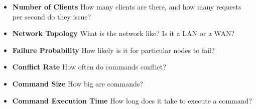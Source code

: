 \begin{itemize}
  \item \textbf{Number of Clients}
    How many clients are there, and how many requests per second do they issue?

  \item \textbf{Network Topology}
    What is the network like? Is it a LAN or a WAN?

  \item \textbf{Failure Probability}
    How likely is it for particular nodes to fail?

  \item \textbf{Conflict Rate}
    How often do commands conflict?

  \item \textbf{Command Size}
    How big are commands?

  \item \textbf{Command Execution Time}
    How long does it take to execute a command?
\end{itemize}
